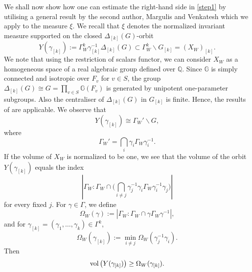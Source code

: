 \documentclass[11pt,reqno,a4paper]{amsart}
\numberwithin{equation}{section}
\newcommand{\bG}{\mathbb{G}}
\newcommand{\bQ}{\mathbb{Q}}
\theoremstyle{theorem}
\theoremstyle{definition}
\begin{document}
We shall now show how one can estimate the right-hand side in 
\eqref{step1} by utilising a general result by the second author, Margulis and Venkatesh  \cite[Theorem~1.3]{EMV}
which we apply to the measure
 $\xi$. We recall that $\xi$ denotes the normalized invariant measure supported on the closed $\Delta_{[k]}(G)$-orbit 
\[
Y(\gamma_{[k]}) := \Gamma_W^k \gamma_{[k]}^{-1} \Delta_{[k]}(G) \subset \Gamma_W^k \backslash G_{[k]} = (X_W)_{[k]}.
\]
We note that using the restriction of scalars functor,
we can consider $X_W$ as a homogeneous space 
of a real algebraic group defined over $\bQ$.
Since $\bG$ is simply connected and isotropic over $F_v$ for $v\in S$,
the group $\Delta_{[k]}(G)\cong G=\prod_{v\in S} \bG(F_v)$ is generated by
unipotent one-parameter subgroups.
Also the centraliser of $\Delta_{[k]}(G)$ in $G_{[k]}$ is finite.
Hence, the results of \cite{EMV} are applicable.
We observe that
$$
Y(\gamma_{[k]}) \cong \Gamma_{W}' \backslash G,
$$
where 
\[
\Gamma_{W}'=\bigcap_i \gamma_i \Gamma_W \gamma_i^{-1}.
\]
 If the volume of $X_W$ is normalized to be one, we see that the volume of the orbit $Y(\gamma_{[k]})$ equals 
the index
\[
\left|\Gamma_W :  \Gamma_W \cap \Big( \bigcap_{i \neq j} \gamma_j^{-1} \gamma_i \Gamma_W \gamma_i^{-1} \gamma_j\Big)\right|
\]
for every fixed $j$.
For $\gamma\in \Gamma$, we define
$$
\Omega_W(\gamma):=|\Gamma_W : \Gamma_W\cap\gamma \Gamma_W \gamma^{-1}|,
$$
and for $\gamma_{[k]} = (\gamma_1,\ldots,\gamma_k) \in \Gamma^k$,
$$
\Omega_W(\gamma_{[k]}):=\min_{i \neq j} \Omega_W(\gamma_j^{-1} \gamma_i).
$$
Then 
$$
\hbox{vol}\left(Y(\gamma_{[k]})\right)\ge \Omega_W(\gamma_{[k]}).
$$
\end{document}
